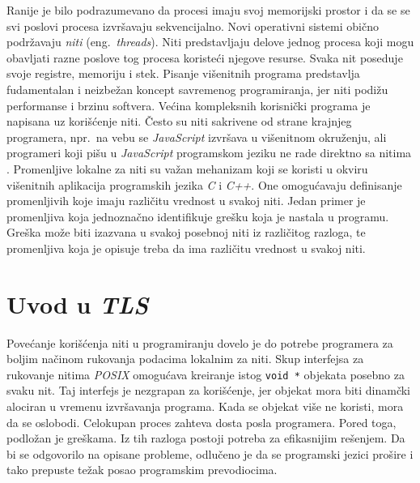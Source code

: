 \documentclass[12pt,oneside]{memoir}
\begin{document}
Ranije je bilo podrazumevano da procesi imaju svoj memorijski prostor i da se se svi poslovi procesa izvršavaju sekvencijalno. Novi operativni sistemi obično podržavaju \emph{niti} (eng.~\emph{threads}). Niti predstavljaju delove jednog procesa koji mogu obavljati razne poslove tog procesa koristeći njegove resurse. Svaka nit poseduje svoje registre, memoriju i stek. Pisanje višenitnih programa predstavlja fudamentalan i neizbežan koncept savremenog programiranja, jer niti podižu performanse i brzinu softvera. Većina kompleksnih korisnički programa je napisana uz korišćenje niti. Često su niti sakrivene od strane krajnjeg programera, npr.~na vebu se \emph{JavaScript} izvršava u višenitnom okruženju, ali programeri koji pišu u \emph{JavaScript} programskom jeziku ne rade direktno sa nitima \cite{JavaScript}. Promenljive lokalne za niti su važan mehanizam koji se koristi u okviru višenitnih aplikacija programskih jezika \emph{C} i \emph{C++}. One omogućavaju definisanje promenljivih koje imaju različitu vrednost u svakoj niti. Jedan primer je promenljiva koja jednoznačno identifikuje grešku koja je nastala u programu. Greška može biti izazvana u svakoj posebnoj niti iz različitog razloga, te promenljiva koja je opisuje treba da ima različitu vrednost u svakoj niti.

\section{Uvod u \emph{TLS}}

Povećanje korišćenja niti u programiranju dovelo je do potrebe programera za boljim načinom rukovanja podacima lokalnim za niti. Skup interfejsa za rukovanje nitima \emph{POSIX} \cite{POSIX} omogućava kreiranje istog \texttt{void *} objekata posebno za svaku nit. Taj interfejs je nezgrapan za korišćenje, jer objekat mora biti dinamčki alociran u vremenu izvršavanja programa. Kada se objekat više ne koristi, mora da se oslobodi. Celokupan proces zahteva dosta posla programera. Pored toga, podložan je greškama. Iz tih razloga postoji potreba za efikasnijim rešenjem. Da bi se odgovorilo na opisane probleme, odlučeno je da se programski jezici prošire i tako prepuste težak posao programskim prevodiocima.
\end{document}
